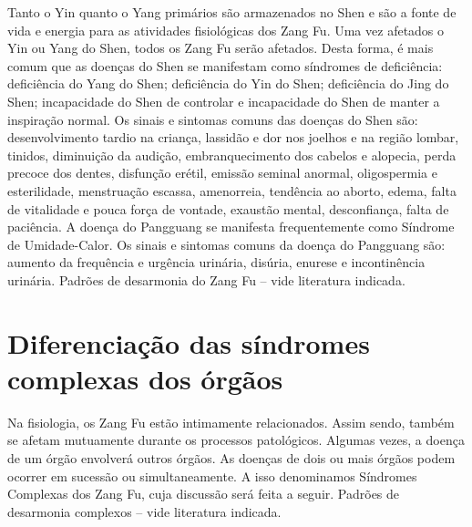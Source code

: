 \documentclass[12pt,oneside,a4paper]{book} %
\begin{document}
Tanto o Yin quanto o Yang primários são armazenados no Shen e são a fonte de vida e energia para as atividades fisiológicas dos Zang Fu. Uma vez afetados o Yin ou Yang do Shen, todos os Zang Fu serão afetados. 
Desta forma, é mais comum que as doenças do Shen se manifestam como síndromes de deficiência: deficiência do Yang do Shen; deficiência do Yin do Shen; deficiência do Jing do Shen; incapacidade do Shen de controlar e incapacidade do Shen de manter a inspiração normal. Os sinais e sintomas comuns das doenças do Shen são: desenvolvimento tardio na criança, lassidão e dor nos joelhos e na região lombar, tinidos, diminuição da audição, embranquecimento dos cabelos e alopecia, perda precoce dos dentes, disfunção erétil, emissão seminal anormal, oligospermia e esterilidade, menstruação escassa, amenorreia, tendência ao aborto, edema, falta de vitalidade e pouca força de vontade, exaustão mental, desconfiança, falta de paciência.
A doença do Pangguang se manifesta frequentemente como Síndrome de Umidade-Calor. Os sinais e sintomas comuns da doença do Pangguang são: aumento da frequência e urgência urinária, disúria, enurese e incontinência urinária.
Padrões de desarmonia do Zang Fu – vide literatura indicada.

\section{Diferenciação das síndromes complexas dos órgãos}

Na fisiologia, os Zang Fu estão intimamente relacionados. Assim sendo, também se afetam mutuamente durante os processos patológicos. Algumas vezes, a doença de um órgão envolverá outros órgãos. As doenças de dois ou mais órgãos podem ocorrer em sucessão ou simultaneamente. A isso denominamos Síndromes Complexas dos Zang Fu, cuja discussão será feita a seguir.
Padrões de desarmonia complexos – vide literatura indicada.



\nocite{maciocia1996fundamentos}
\nocite{yamamura2001acupuntura}
\nocite{filshie2002acupuntura}
\nocite{nongacupuntura}
\nocite{wang2005tratado}
\nocite{yamamura2001acupuntura}
\nocite{bittar2014manual}
\end{document}
